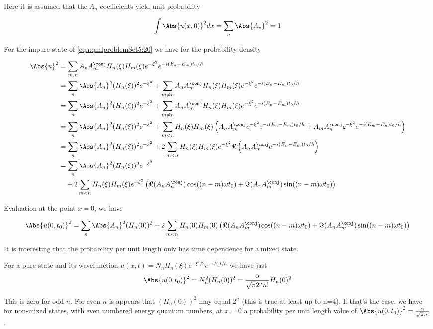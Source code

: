 Here it is assumed that the $A_n$ coefficients yield unit probability

\begin{equation}\label{eqn:qmIproblemSet5:30}
\int \Abs{u(x,0)}^2 dx = \sum_n \Abs{A_n}^2 = 1
\end{equation}

For the impure state of \ref{eqn:qmIproblemSet5:20} we have for the probability density

\begin{align*}
\Abs{u}^2
&=
\sum_{m,n}
A_n A_m^\conj H_n(\xi) H_m(\xi) e^{-\xi^2} e^{-i (E_n - E_m)t_0/\hbar} \\
&=
\sum_n
\Abs{A_n}^2 (H_n(\xi))^2 e^{-\xi^2}
+\sum_{m \ne n}
A_n A_m^\conj H_n(\xi) H_m(\xi) e^{-\xi^2} e^{-i (E_n - E_m)t_0/\hbar} \\
&=
\sum_n
\Abs{A_n}^2 (H_n(\xi))^2 e^{-\xi^2}
+\sum_{m \ne n}
A_n A_m^\conj H_n(\xi) H_m(\xi) e^{-\xi^2} e^{-i (E_n - E_m)t_0/\hbar} \\
&=
\sum_n
\Abs{A_n}^2 (H_n(\xi))^2 e^{-\xi^2}
+\sum_{m < n}
H_n(\xi) H_m(\xi)
\left(
A_n A_m^\conj
e^{-\xi^2} e^{-i (E_n - E_m)t_0/\hbar}
+A_m A_n^\conj
e^{-\xi^2} e^{-i (E_m - E_n)t_0/\hbar}
\right) \\
&=
\sum_n
\Abs{A_n}^2 (H_n(\xi))^2 e^{-\xi^2}
+2 \sum_{m < n}
H_n(\xi) H_m(\xi)
e^{-\xi^2}
\Re \left(
A_n A_m^\conj
e^{-i (E_n - E_m)t_0/\hbar}
\right) \\
&=
\sum_n
\Abs{A_n}^2 (H_n(\xi))^2 e^{-\xi^2}  \\
&\quad+2 \sum_{m < n}
H_n(\xi) H_m(\xi)
e^{-\xi^2}
\left(
\Re ( A_n A_m^\conj ) \cos( (n - m)\omega t_0)
+\Im ( A_n A_m^\conj ) \sin( (n - m)\omega t_0)
\right) \\
\end{align*}

Evaluation at the point $x = 0$, we have

\begin{equation}\label{eqn:qmIproblemSet5:500}
\Abs{u(0,t_0)}^2
=
\sum_n
\Abs{A_n}^2 (H_n(0))^2 +2 \sum_{m < n} H_n(0) H_m(0) \left( \Re ( A_n A_m^\conj ) \cos( (n - m)\omega t_0) +\Im ( A_n A_m^\conj ) \sin( (n - m)\omega t_0)
\right)
\end{equation}

It is interesting that the probability per unit length only has time dependence for a mixed state.

For a pure state and its wavefunction $u(x,t) = N_n H_n(\xi) e^{-\xi^2/2} e^{-i E_n t/\hbar}$ we have just
\begin{equation}\label{eqn:qmIproblemSet5:510}
\Abs{u(0,t_0)}^2
=
N_n^2 (H_n(0))^2 = \frac{\alpha}{\sqrt{\pi} 2^n n!} H_n(0)^2
\end{equation}

This is zero for odd $n$.  For even $n$ is appears that $(H_n(0))^2$ may equal $2^n$ (this is true at least up to n=4).  If that's the case, we have for non-mixed states, with even numbered energy quantum numbers, at $x=0$ a probability per unit length value of $\Abs{u(0,t_0)}^2 = \frac{\alpha}{\sqrt{\pi} n!}$.

\EndNoBibArticle
